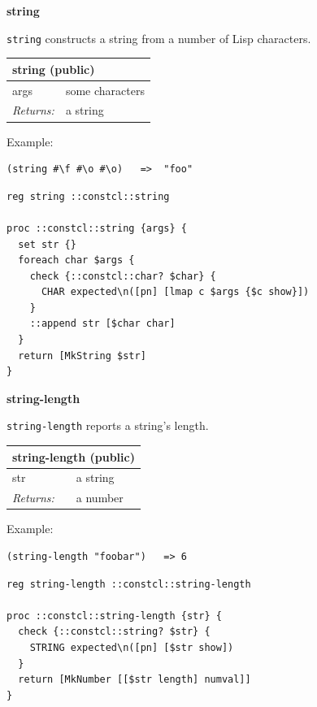 \documentclass[twoside,9pt]{report}
\begin{document}
\textbf{string}


\texttt{string} constructs a string from a number of Lisp characters.

\begin{tabular}{ |l l| }
\hline
\multicolumn{2}{|l|}{string (public)} \\
\hline
args & some characters \\
\textit{Returns:} & a string \\
\hline
\end{tabular}


Example:

\noindent\makebox[\linewidth]{\rule{\linewidth}{0.4pt}}
\begin{lstlisting}
(string #\f #\o #\o)   =>  "foo"
\end{lstlisting}
\noindent\makebox[\linewidth]{\rule{\linewidth}{0.4pt}}
\noindent\makebox[\linewidth]{\rule{\linewidth}{0.4pt}}
\begin{lstlisting}
reg string ::constcl::string
 
proc ::constcl::string {args} {
  set str {}
  foreach char $args {
    check {::constcl::char? $char} {
      CHAR expected\n([pn] [lmap c $args {$c show}])
    }
    ::append str [$char char]
  }
  return [MkString $str]
}
\end{lstlisting}
\noindent\makebox[\linewidth]{\rule{\linewidth}{0.4pt}}

\textbf{string-length}


\texttt{string-length} reports a string's length.

\begin{tabular}{ |l l| }
\hline
\multicolumn{2}{|l|}{string-length (public)} \\
\hline
str & a string \\
\textit{Returns:} & a number \\
\hline
\end{tabular}


Example:

\noindent\makebox[\linewidth]{\rule{\linewidth}{0.4pt}}
\begin{lstlisting}
(string-length "foobar")   => 6
\end{lstlisting}
\noindent\makebox[\linewidth]{\rule{\linewidth}{0.4pt}}
\noindent\makebox[\linewidth]{\rule{\linewidth}{0.4pt}}
\begin{lstlisting}
reg string-length ::constcl::string-length
 
proc ::constcl::string-length {str} {
  check {::constcl::string? $str} {
    STRING expected\n([pn] [$str show])
  }
  return [MkNumber [[$str length] numval]]
}
\end{lstlisting}
\noindent\makebox[\linewidth]{\rule{\linewidth}{0.4pt}}
\end{document}
